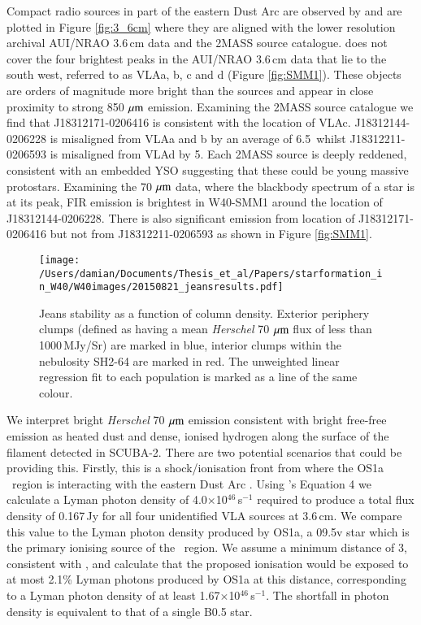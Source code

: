 Compact radio sources in part of the eastern Dust Arc are observed by \cite{Rodriguez:2010bs} 
and are plotted in Figure \ref{fig:3_6cm} where they are aligned with the lower resolution archival 
AUI/NRAO 3.6\,cm data and the 2MASS source catalogue. \cite{Rodriguez:2010bs} does not cover 
the four brightest peaks in the AUI/NRAO 3.6\,cm data that lie to the south west, referred to as 
VLAa, b, c and d (Figure \ref{fig:SMM1}). These objects are orders of magnitude more bright than 
the \cite{Rodriguez:2010bs} sources and appear in close proximity to strong 850\,$\,\mu\rm{m}$ emission. 
Examining the 2MASS source catalogue we find that J18312171-0206416 is consistent with the 
location of VLAc. J18312144-0206228 is misaligned from VLAa and b by an average of 6.5\arcsec\ 
whilst J18312211-0206593 is misaligned from VLAd by 5\arcsec. Each 2MASS source is deeply 
reddened, consistent with an embedded YSO suggesting that these could be young massive 
protostars. Examining the 70\,$\,\mu\rm{m}$ data, where the blackbody spectrum of a star is at its 
peak, FIR emission is brightest in W40-SMM1 around the location of J18312144-0206228. 
There is also significant emission from location of J18312171-0206416 but not from 
J18312211-0206593 as shown in Figure \ref{fig:SMM1}. 

\begin{figure}
\begin{center}
\texttt{[image: /Users/damian/Documents/Thesis\_et\_al/Papers/starformation\_in\_W40/W40images/20150821\_jeansresults.pdf]}
\caption{Jeans stability as a function of column density. Exterior periphery clumps (defined as having a mean \emph{Herschel} 70\,$\,\mu\rm{m}$ flux of less than 1000\,MJy/Sr) are marked in blue, interior clumps within the nebulosity SH2-64 are marked in red. The unweighted linear regression fit to each population is marked as a line of the same colour.}
\label{fig:jeans}
\end{center}
\end{figure}

We interpret bright \emph{Herschel} 70\,$\,\mu\rm{m}$ emission consistent with bright free-free emission 
as heated dust and dense, ionised hydrogen along the surface of the filament detected in SCUBA-2. There are two 
potential scenarios that could be providing this. Firstly, this is a shock/ionisation front from where the 
OS1a \HII\ region is interacting with the eastern Dust Arc \citep{Vallee:1991zr}. Using \cite{Kurtz:1994cr}'s 
Equation 4 we calculate a Lyman photon density of 4.0$\times$10$^{46}$\,s$^{-1}$ required to 
produce a total flux density of 0.167\,Jy for all four unidentified VLA sources at 3.6\,cm. We compare 
this value to the Lyman photon density produced by OS1a, a 09.5v star which is the primary ionising 
source of the \HII\ region. We assume a minimum distance of 3\arcmin, consistent with \cite{Vallee:1991zr}, 
and calculate that the proposed ionisation would be exposed to at most 2.1\% Lyman photons produced by 
OS1a at this distance, corresponding to a Lyman photon density of at least 1.67$\times$10$^{46}$\,s$^{-1}$. 
The shortfall in photon density is equivalent to that of a single B0.5 star.

